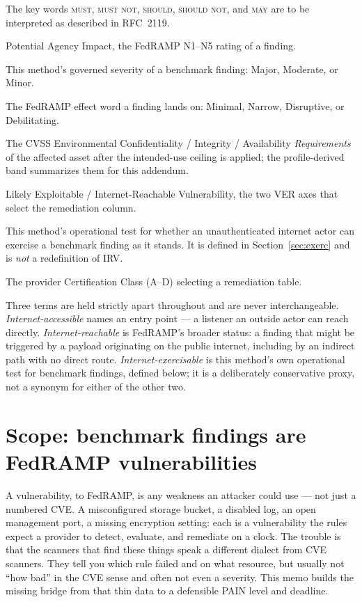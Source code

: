 \documentclass[11pt]{article}
\newcommand{\rfckw}[1]{\textsc{#1}}
\begin{document}
The key words \rfckw{must}, \rfckw{must not}, \rfckw{should}, \rfckw{should not},
and \rfckw{may} are to be interpreted as described in RFC~2119.

\begin{description}[leftmargin=1.5em,style=nextline]
\item[PAIN] Potential Agency Impact, the FedRAMP N1--N5 rating of a finding.
\item[Grade] This method's governed severity of a benchmark finding: Major,
  Moderate, or Minor.
\item[Customer effect] The FedRAMP effect word a finding lands on: Minimal, Narrow,
  Disruptive, or Debilitating.
\item[CR/IR/AR] The CVSS Environmental Confidentiality / Integrity / Availability
  \emph{Requirements} of the affected asset after the intended-use ceiling is
  applied; the profile-derived band summarizes them for this addendum.
\item[LEV / IRV] Likely Exploitable / Internet-Reachable Vulnerability, the two VER
  axes that select the remediation column.
\item[Internet-exercisable] This method's operational test for whether an
  unauthenticated internet actor can exercise a benchmark finding as it stands. It
  is defined in Section~\ref{sec:exerc} and is \emph{not} a redefinition of IRV.
\item[Class] The provider Certification Class (A--D) selecting a remediation table.
\end{description}

Three terms are held strictly apart throughout and are never interchangeable.
\emph{Internet-accessible} names an entry point --- a listener an outside actor can
reach directly. \emph{Internet-reachable} is FedRAMP's broader status: a finding
that might be triggered by a payload originating on the public internet, including
by an indirect path with no direct route. \emph{Internet-exercisable} is this
method's own operational test for benchmark findings, defined below; it is a
deliberately conservative proxy, not a synonym for either of the other two.

\section{Scope: benchmark findings are FedRAMP vulnerabilities}
\label{sec:scope}
\begin{plain}
A vulnerability, to FedRAMP, is any weakness an attacker could use --- not just a
numbered CVE. A misconfigured storage bucket, a disabled log, an open management
port, a missing encryption setting: each is a vulnerability the rules expect a
provider to detect, evaluate, and remediate on a clock. The trouble is that the
scanners that find these things speak a different dialect from CVE scanners. They
tell you which rule failed and on what resource, but usually not ``how bad'' in the
CVE sense and often not even a severity. This memo builds the missing bridge from
that thin data to a defensible PAIN level and deadline.
\end{plain}
\end{document}
